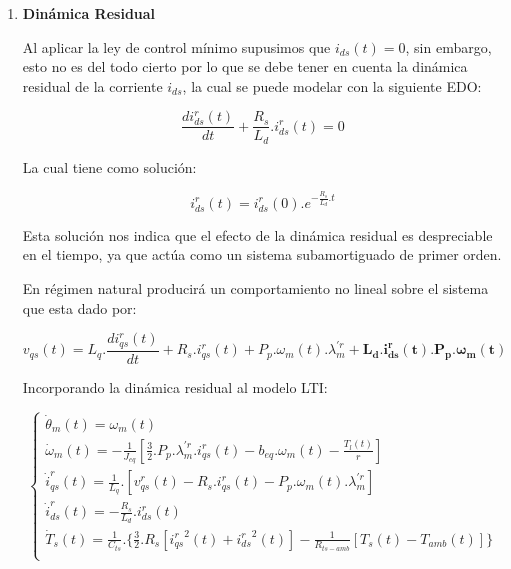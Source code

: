 \documentclass{article}
\begin{document}
\begin{enumerate}[label=\roman*.]
    \item \textbf{Dinámica Residual}
    
    Al aplicar la ley de control mínimo supusimos que $i_{ds}(t) = 0$, sin embargo, esto no es del todo cierto
    por lo que se debe tener en cuenta la dinámica residual de la corriente $i_{ds}$, la cual se puede
    modelar con la siguiente EDO:

    \begin{equation}
        \frac{di_{ds}^r(t)}{dt} + \frac{R_{s}}{L_{d}}.i_{ds}^r(t) = 0 
    \end{equation} 

    La cual tiene como solución:

    \begin{equation}
        i_{ds}^r(t) = i_{ds}^r(0).e^{-\frac{R_{s}}{L_{d}}.t}
    \end{equation}

    Esta solución nos indica que el efecto de la dinámica residual es despreciable en el tiempo, ya que actúa como
    un sistema subamortiguado de primer orden.

    En régimen natural producirá un comportamiento no lineal sobre el sistema que esta dado por:

    \begin{equation}\label{eq.dinamica_residual}
        v_{qs}(t) = L_{q}.\frac{di_{qs}^r(t)}{dt} + R_{s}.i_{qs}^r(t) + P_{p}.\omega_{m}(t).\lambda_{m}^{\prime r} + \mathbf{L_{d}.i_{ds}^r(t).P_{p}.\omega_{m}(t)}
    \end{equation}

    Incorporando la dinámica residual al modelo LTI:    

    \begin{equation}
        \begin{cases}
            \dot{\theta}_{m}(t) = \omega_{m}(t)\\
            \dot{\omega}_{m}(t) = -\frac{1}{J_{eq}}[\frac{3}{2}.P_{p}.\lambda_{m}^{\prime r} .i_{qs}^r(t) - b_{eq}.\omega_{m}(t)-\frac{T_{l}(t)}{r}]\\
            \dot{i}_{qs}^r(t) = \frac{1}{L_{q}}.[v_{qs}^r(t) - R_{s}.i_{qs}^r(t) - P_{p}.\omega_{m}(t).\lambda_{m}^{\prime r}]\\
            \dot{i}_{ds}^r(t) = -\frac{R_{s}}{L_{d}}.i_{ds}^r(t) \\
            \dot{T}_{s}(t) = \frac{1}{C_{ts}}.\{\frac{3}{2}.R_{s}[{i_{qs}^r}^2(t) + {i_{ds}^r}^2(t)] - \frac{1}{R_{ts-amb}}[T_{s}(t) - T_{amb}(t)]\}\\
        \end{cases}    
    \end{equation}


\end{enumerate}
\end{document}
